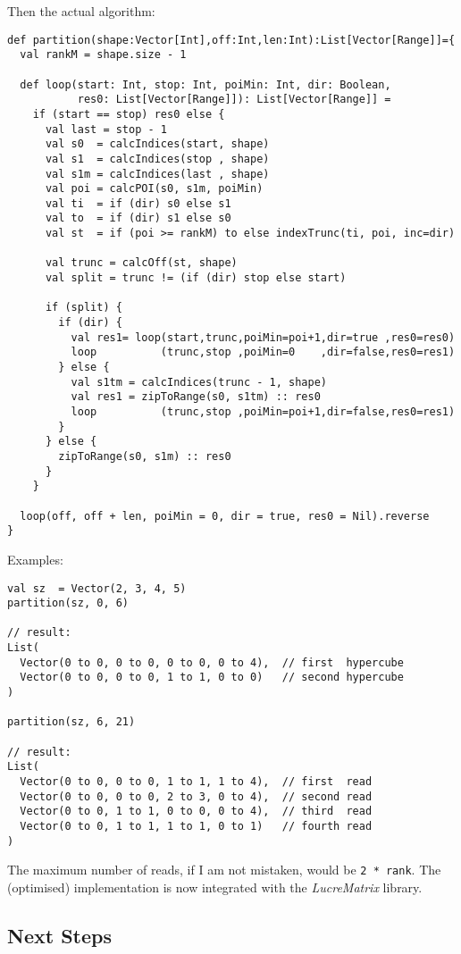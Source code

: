 \documentclass[11pt,a4paper]{article}
\newcommand{\software}[1]{\textit{#1}}
\begin{document}
%
Then the actual algorithm:
%
\begin{lstlisting}[style=scala]
def partition(shape:Vector[Int],off:Int,len:Int):List[Vector[Range]]={
  val rankM = shape.size - 1

  def loop(start: Int, stop: Int, poiMin: Int, dir: Boolean,
           res0: List[Vector[Range]]): List[Vector[Range]] =
    if (start == stop) res0 else {
      val last = stop - 1
      val s0  = calcIndices(start, shape)
      val s1  = calcIndices(stop , shape)
      val s1m = calcIndices(last , shape)
      val poi = calcPOI(s0, s1m, poiMin)
      val ti  = if (dir) s0 else s1
      val to  = if (dir) s1 else s0
      val st  = if (poi >= rankM) to else indexTrunc(ti, poi, inc=dir)

      val trunc = calcOff(st, shape)
      val split = trunc != (if (dir) stop else start)

      if (split) {
        if (dir) {
          val res1= loop(start,trunc,poiMin=poi+1,dir=true ,res0=res0)
          loop          (trunc,stop ,poiMin=0    ,dir=false,res0=res1)
        } else {
          val s1tm = calcIndices(trunc - 1, shape)
          val res1 = zipToRange(s0, s1tm) :: res0
          loop          (trunc,stop ,poiMin=poi+1,dir=false,res0=res1)
        }
      } else {
        zipToRange(s0, s1m) :: res0
      }
    }

  loop(off, off + len, poiMin = 0, dir = true, res0 = Nil).reverse
}
\end{lstlisting}
%
Examples:
%
\begin{lstlisting}[style=scala]
val sz  = Vector(2, 3, 4, 5)
partition(sz, 0, 6)

// result:
List(
  Vector(0 to 0, 0 to 0, 0 to 0, 0 to 4),  // first  hypercube
  Vector(0 to 0, 0 to 0, 1 to 1, 0 to 0)   // second hypercube
)

partition(sz, 6, 21)

// result:
List(
  Vector(0 to 0, 0 to 0, 1 to 1, 1 to 4),  // first  read
  Vector(0 to 0, 0 to 0, 2 to 3, 0 to 4),  // second read
  Vector(0 to 0, 1 to 1, 0 to 0, 0 to 4),  // third  read
  Vector(0 to 0, 1 to 1, 1 to 1, 0 to 1)   // fourth read
)
\end{lstlisting}
%
The maximum number of reads, if I am not mistaken, would be \Verb!2 * rank!.
The (optimised) implementation is now integrated with the \software{LucreMatrix} library.

\subsection{Next Steps}
\end{document}
